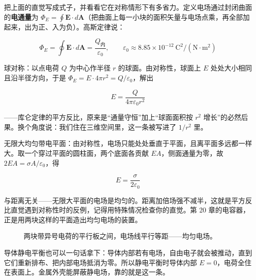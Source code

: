 \begin{mathbridge}
把上面的直觉写成式子，并看看它在对称情形下有多省力。定义电场通过封闭曲面的\textbf{电通量}为 \(\varPhi_E=\oint \mathbf E\cdot d\mathbf A\)（把曲面上每一小块的面积矢量与电场点乘，再全部加起来，出为正、入为负）。高斯定律说：

\[ \varPhi_E=\oint \mathbf E\cdot d\mathbf A=\frac{Q_{\text{内}}}{\varepsilon_0},\qquad \varepsilon_0\approx 8.85\times10^{-12}\ \mathrm{C^2/(N\cdot m^2)} \]

球对称：以点电荷 \(Q\) 为中心作半径 \(r\) 的球面。由对称性，球面上 \(E\) 处处大小相同且沿半径方向，于是 \(\varPhi_E = E\cdot 4\pi r^2 = Q/\varepsilon_0\)，解出

\[ E=\frac{Q}{4\pi\varepsilon_0 r^2} \]

——库仑定律的平方反比，原来是“通量守恒”加上“球面面积按 \(r^2\) 增长”的必然后果。换个角度说：我们住在三维空间里，这一条被写进了 \(1/r^2\) 里。

无限大均匀带电平面：由对称性，电场只能处处垂直于平面，且离平面多远都一样大。取一个穿过平面的圆柱面，两个底面各贡献 \(EA\)，侧面通量为零，故 \(2EA=\sigma A/\varepsilon_0\)，得

\[ E=\frac{\sigma}{2\varepsilon_0} \]

与距离无关——无限大平面的电场是均匀的。距离加倍场强不减半，这就是平方反比直觉遇到对称性时的反例，记得用特殊情况检查你的直觉。第 20 章的电容器，正是用两块这样的平面造出均匀电场的装置。
\end{mathbridge}

\begin{figure}[htbp]
\centering
{}
\caption{两块带异号电荷的平行板之间，电场线平行等距——均匀电场。}
\end{figure}

\begin{mathbridge}

导体静电平衡也可以一句话拿下：导体内部若有电场，自由电子就会被推动，直到它们重新排布、把内部电场抵消为零。所以静电平衡时导体内部 \(E=0\)，电荷全住在表面上。金属外壳能屏蔽静电场，靠的就是这一条。
\end{mathbridge}

